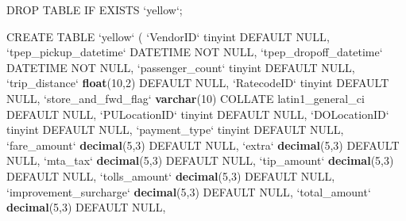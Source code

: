 \documentclass[12pt,twoside]{reedthesis}
\newenvironment{Shaded}{\begin{snugshade}}{\end{snugshade}}
\newcommand{\KeywordTok}[1]{\textcolor[rgb]{0.13,0.29,0.53}{\textbf{#1}}}
\newcommand{\DataTypeTok}[1]{\textcolor[rgb]{0.13,0.29,0.53}{#1}}
\newcommand{\DecValTok}[1]{\textcolor[rgb]{0.00,0.00,0.81}{#1}}
\newcommand{\StringTok}[1]{\textcolor[rgb]{0.31,0.60,0.02}{#1}}
\newcommand{\OtherTok}[1]{\textcolor[rgb]{0.56,0.35,0.01}{#1}}
\newcommand{\NormalTok}[1]{#1}
\theoremstyle{definition}
\theoremstyle{definition}
\theoremstyle{definition}
\theoremstyle{remark}
\begin{document}
\begin{Shaded}
\begin{Highlighting}[]
\NormalTok{DROP TABLE IF EXISTS }\StringTok{`}\DataTypeTok{yellow}\StringTok{`}\NormalTok{;}

\NormalTok{CREATE TABLE }\StringTok{`}\DataTypeTok{yellow}\StringTok{`}\NormalTok{ (}
 \StringTok{`}\DataTypeTok{VendorID}\StringTok{`}\NormalTok{ tinyint DEFAULT }\OtherTok{NULL}\NormalTok{,}
 \StringTok{`}\DataTypeTok{tpep_pickup_datetime}\StringTok{`}\NormalTok{ DATETIME NOT }\OtherTok{NULL}\NormalTok{,}
 \StringTok{`}\DataTypeTok{tpep_dropoff_datetime}\StringTok{`}\NormalTok{ DATETIME NOT }\OtherTok{NULL}\NormalTok{,}
 \StringTok{`}\DataTypeTok{passenger_count}\StringTok{`}\NormalTok{ tinyint DEFAULT }\OtherTok{NULL}\NormalTok{,}
 \StringTok{`}\DataTypeTok{trip_distance}\StringTok{`} \KeywordTok{float}\NormalTok{(}\DecValTok{10}\NormalTok{,}\DecValTok{2}\NormalTok{) DEFAULT }\OtherTok{NULL}\NormalTok{,}
 \StringTok{`}\DataTypeTok{RatecodeID}\StringTok{`}\NormalTok{ tinyint DEFAULT }\OtherTok{NULL}\NormalTok{,}
 \StringTok{`}\DataTypeTok{store_and_fwd_flag}\StringTok{`} \KeywordTok{varchar}\NormalTok{(}\DecValTok{10}\NormalTok{) COLLATE latin1_general_ci DEFAULT }\OtherTok{NULL}\NormalTok{,}
 \StringTok{`}\DataTypeTok{PULocationID}\StringTok{`}\NormalTok{ tinyint DEFAULT }\OtherTok{NULL}\NormalTok{,}
 \StringTok{`}\DataTypeTok{DOLocationID}\StringTok{`}\NormalTok{ tinyint DEFAULT }\OtherTok{NULL}\NormalTok{,}
 \StringTok{`}\DataTypeTok{payment_type}\StringTok{`}\NormalTok{ tinyint DEFAULT }\OtherTok{NULL}\NormalTok{,}
 \StringTok{`}\DataTypeTok{fare_amount}\StringTok{`} \KeywordTok{decimal}\NormalTok{(}\DecValTok{5}\NormalTok{,}\DecValTok{3}\NormalTok{) DEFAULT }\OtherTok{NULL}\NormalTok{,}
 \StringTok{`}\DataTypeTok{extra}\StringTok{`} \KeywordTok{decimal}\NormalTok{(}\DecValTok{5}\NormalTok{,}\DecValTok{3}\NormalTok{) DEFAULT }\OtherTok{NULL}\NormalTok{,}
 \StringTok{`}\DataTypeTok{mta_tax}\StringTok{`} \KeywordTok{decimal}\NormalTok{(}\DecValTok{5}\NormalTok{,}\DecValTok{3}\NormalTok{) DEFAULT }\OtherTok{NULL}\NormalTok{,}
 \StringTok{`}\DataTypeTok{tip_amount}\StringTok{`} \KeywordTok{decimal}\NormalTok{(}\DecValTok{5}\NormalTok{,}\DecValTok{3}\NormalTok{) DEFAULT }\OtherTok{NULL}\NormalTok{,}
 \StringTok{`}\DataTypeTok{tolls_amount}\StringTok{`} \KeywordTok{decimal}\NormalTok{(}\DecValTok{5}\NormalTok{,}\DecValTok{3}\NormalTok{) DEFAULT }\OtherTok{NULL}\NormalTok{,}
 \StringTok{`}\DataTypeTok{improvement_surcharge}\StringTok{`} \KeywordTok{decimal}\NormalTok{(}\DecValTok{5}\NormalTok{,}\DecValTok{3}\NormalTok{) DEFAULT }\OtherTok{NULL}\NormalTok{,}
 \StringTok{`}\DataTypeTok{total_amount}\StringTok{`} \KeywordTok{decimal}\NormalTok{(}\DecValTok{5}\NormalTok{,}\DecValTok{3}\NormalTok{) DEFAULT }\OtherTok{NULL}\NormalTok{,}

\end{Highlighting}
\end{Shaded}
\end{document}

